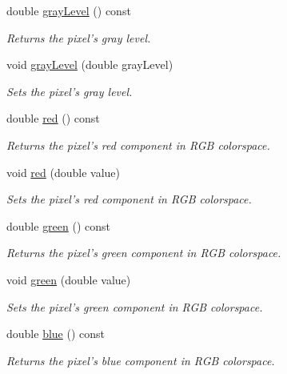 \begin{CompactItemize}
double \hyperlink{class_pixel_6e445cee8bfa4475238823e0b6da42b0}{grayLevel} () const 
\begin{CompactList}\small\item\em Returns the pixel's gray level. \item\end{CompactList}\item 
void \hyperlink{class_pixel_03f96954bfc27f8f8810e8c6e58828f8}{grayLevel} (double grayLevel)
\begin{CompactList}\small\item\em Sets the pixel's gray level. \item\end{CompactList}\item 
double \hyperlink{class_pixel_52542702e90cafc9c29713c23cd35e8f}{red} () const 
\begin{CompactList}\small\item\em Returns the pixel's red component in RGB colorspace. \item\end{CompactList}\item 
void \hyperlink{class_pixel_cc64470d744c5fc5b26cedb027366b5d}{red} (double value)
\begin{CompactList}\small\item\em Sets the pixel's red component in RGB colorspace. \item\end{CompactList}\item 
double \hyperlink{class_pixel_71606a21fe4efc55a5ce5bb318b629f7}{green} () const 
\begin{CompactList}\small\item\em Returns the pixel's green component in RGB colorspace. \item\end{CompactList}\item 
void \hyperlink{class_pixel_98aaded2bc7bf4708edaaf2445acae0f}{green} (double value)
\begin{CompactList}\small\item\em Sets the pixel's green component in RGB colorspace. \item\end{CompactList}\item 
double \hyperlink{class_pixel_978b4078a48ff2a67b55dd10eec78fb2}{blue} () const 
\begin{CompactList}\small\item\em Returns the pixel's blue component in RGB colorspace. \item\end{CompactList}\item 

\end{CompactItemize}
